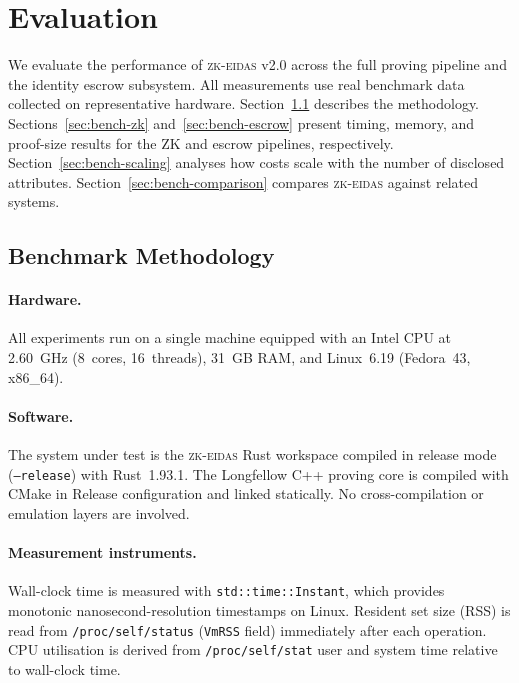 \section{Evaluation}\label{sec:evaluation}\label{sec:benchmarks}

We evaluate the performance of \textsc{zk-eidas} v2.0 across the full proving pipeline and the identity escrow subsystem.
All measurements use real benchmark data collected on representative hardware.
Section~\ref{sec:bench-method} describes the methodology.
Sections~\ref{sec:bench-zk} and~\ref{sec:bench-escrow} present timing, memory, and proof-size results for the ZK and escrow pipelines, respectively.
Section~\ref{sec:bench-scaling} analyses how costs scale with the number of disclosed attributes.
Section~\ref{sec:bench-comparison} compares \textsc{zk-eidas} against related systems.

\subsection{Benchmark Methodology}\label{sec:bench-method}

\paragraph{Hardware.}
All experiments run on a single machine equipped with an Intel CPU at 2.60~GHz (8~cores, 16~threads), 31~GB RAM, and Linux~6.19 (Fedora~43, x86\_64).

\paragraph{Software.}
The system under test is the \textsc{zk-eidas} Rust workspace compiled in release mode (\texttt{--release}) with Rust~1.93.1.
The Longfellow C++ proving core is compiled with CMake in Release configuration and linked statically.
No cross-compilation or emulation layers are involved.

\paragraph{Measurement instruments.}
Wall-clock time is measured with \texttt{std::time::Instant}, which provides monotonic nanosecond-resolution timestamps on Linux.
Resident set size (RSS) is read from \texttt{/proc/self/status} (\texttt{VmRSS} field) immediately after each operation.
CPU utilisation is derived from \texttt{/proc/self/stat} user and system time relative to wall-clock time.

